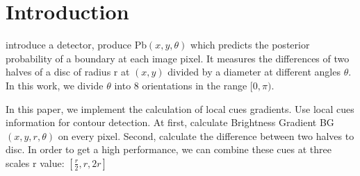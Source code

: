 \documentclass[12pt]{article}
\begin{document}

\section{Introduction}

\cite{3} introduce a detector, produce Pb$(x, y, \theta)$ which predicts the posterior probability of a boundary at each image pixel. It measures the differences of two halves of a disc of radius r at $(x, y)$ divided by a diameter at different angles $\theta$. In this work, we divide $\theta$ into 8 orientations in the range $[0, \pi)$.

In this paper, we implement the calculation of local cues gradients. Use local cues information for contour detection. At first, calculate Brightness Gradient BG$(x, y, r, \theta)$ on every pixel. Second, calculate the difference between two halves to disc. In order to get a high performance, we can combine these cues at three scales r value: $[\frac{r}{2},r,2r]$
\end{document}
